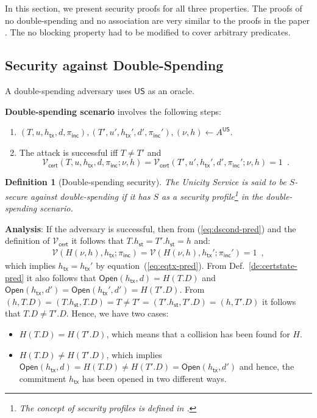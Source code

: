\documentclass{article}
\newtheorem{definition}{Definition}[section]
\newcommand{\open}[0]{\mathsf{Open}}
\newcommand{\unisrv}[0]{\mathsf{US}}
\newcommand{\sthash}[0]{h_\mathsf{st}}
\newcommand{\txhash}[0]{h_\mathsf{tx}}
\newcommand{\univer}[0]{\mathcal{V}}
\newcommand{\certver}[0]{\mathcal{V}_\mathsf{cert}}
\newcommand{\pinc}[0]{\pi_{\mathsf{inc}}}
\newcommand{\predi}[0]{\nu}
\begin{document}
\noindent In this section, we present security proofs for all three properties. The proofs of no double-spending and no association are very similar to the proofs in the paper \cite{BTLR25}. The no blocking property
had to be modified to cover arbitrary predicates.

\subsection{Security against Double-Spending}

A double-spending adversary uses $\unisrv$ as an oracle. \medskip

\noindent\textbf{Double-spending scenario} involves the following steps:
\begin{enumerate}
\item $(T,u,\txhash,d,\pinc),(T',u',\txhash',d',\pinc'),(\predi,h)\gets A^\unisrv$.
\item The attack is successful iff $T\neq T'$ and
\begin{equation}\label{eq:dscond-pred}
\certver(T,u,\txhash,d,\pinc;\predi,h)=\certver(T',u',\txhash',d',\pinc';\predi,h)=1 \enspace.
\end{equation}
\end{enumerate}

\begin{definition}[Double-spending security]
The Unicity Service is said to be $S$-secure against double-spending if it has $S$ as a security profile\footnote{The concept of security profiles is defined in \cite{BTLR25}.} in the double-spending scenario.
\end{definition}

\noindent\textbf{Analysis}: If the adversary is successful, then
from (\ref{eq:dscond-pred}) and the definition of $\certver$ it follows that
$T.\sthash = T'.\sthash=h$ and:
\begin{eqnarray*}
\univer(H(\predi, h), \txhash; \pinc) = \univer(H(\predi, h), \txhash'; \pinc') = 1\enspace,
\end{eqnarray*}
which implies $\txhash=\txhash'$ by equation~(\ref{eq:eqtx-pred}).
From Def.~\ref{de:certstate-pred} it also follows that
$\open(\txhash,d)=H(T.D)$ and $\open(\txhash,d')=\open(\txhash',d')=H(T'.D)$.
From $(h,T.D)=(T.\sthash,T.D)=T\neq T'=(T'.\sthash,T'.D)=(h,T'.D)$ it follows that $T.D\neq T'.D$. Hence, we have two cases:
\begin{itemize}
\item[a)] $H(T.D)=H(T'.D)$, which
means that a collision has been found for $H$.
\item[b)] $H(T.D)\neq H(T'.D)$, which implies $\open(\txhash,d)=H(T.D)\neq H(T'.D)=\open(\txhash,d')$ and hence, the commitment $\txhash$ has been opened in two different ways.
\end{itemize}
\end{document}
